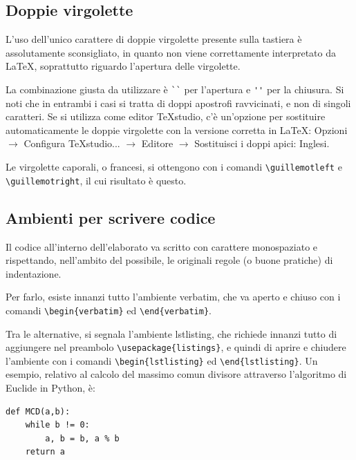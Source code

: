 \documentclass[12pt]{report}
\begin{document}
    \subsection{Doppie virgolette}

    L'uso dell'unico carattere di doppie virgolette presente sulla tastiera è assolutamente sconsigliato, in quanto non viene correttamente interpretato da \LaTeX, soprattutto riguardo l'apertura delle virgolette.

    La combinazione giusta da utilizzare è \verb|``| per l'apertura e \verb|''| per la chiusura. Si noti che in entrambi i casi si tratta di doppi apostrofi ravvicinati, e non di singoli caratteri. Se si utilizza come editor TeXstudio, c'è un'opzione per sostituire automaticamente le doppie virgolette con la versione corretta in \LaTeX: Opzioni $\rightarrow$ Configura TeXstudio... $\rightarrow$ Editore $\rightarrow$ Sostituisci i doppi apici: Inglesi.

    Le virgolette caporali, o francesi, si ottengono con i comandi \verb|\guillemotleft| e \break\verb|\guillemotright|, il cui risultato è \guillemotleft questo\guillemotright.

    \subsection{Ambienti per scrivere codice}

    Il codice all'interno dell'elaborato va scritto con carattere monospaziato e rispettando, nell'ambito del possibile, le originali regole (o buone pratiche) di indentazione.

    Per farlo, esiste innanzi tutto l'ambiente verbatim, che va aperto e chiuso con i comandi \verb|\begin{verbatim}| ed \verb|\end{verbatim}|.

    Tra le alternative, si segnala l'ambiente lstlisting, che richiede innanzi tutto di aggiungere nel preambolo \verb|\usepackage{listings}|, e quindi di aprire e chiudere l'ambiente con i comandi \verb|\begin{lstlisting}| ed \verb|\end{lstlisting}|. Un esempio, relativo al calcolo del massimo comun divisore attraverso l'algoritmo di Euclide in Python, è:

    \begin{lstlisting}
def MCD(a,b):
	while b != 0:
		a, b = b, a % b
	return a
    \end{lstlisting}
\end{document}
